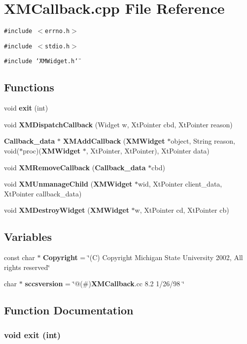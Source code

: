 \section{XMCallback.cpp File Reference}
\label{XMCallback_8cpp}
{\tt \#include $<$errno.h$>$}\par
{\tt \#include $<$stdio.h$>$}\par
{\tt \#include \char`\"{}XMWidget.h\char`\"{}}\par
\subsection*{Functions}
\begin{CompactItemize}
\item 
void {\bf exit} (int)
\item 
void {\bf XMDispatch\-Callback} (Widget w, Xt\-Pointer cbd, Xt\-Pointer reason)
\item 
{\bf Callback\_\-data} $\ast$ {\bf XMAdd\-Callback} ({\bf XMWidget} $\ast$object, String reason, void($\ast$proc)({\bf XMWidget} $\ast$, Xt\-Pointer, Xt\-Pointer), Xt\-Pointer data)
\item 
void {\bf XMRemove\-Callback} ({\bf Callback\_\-data} $\ast$cbd)
\item 
void {\bf XMUnmanage\-Child} ({\bf XMWidget} $\ast$wid, Xt\-Pointer client\_\-data, Xt\-Pointer callback\_\-data)
\item 
void {\bf XMDestroy\-Widget} ({\bf XMWidget} $\ast$w, Xt\-Pointer cd, Xt\-Pointer cb)
\end{CompactItemize}
\subsection*{Variables}
\begin{CompactItemize}
\item 
const char $\ast$ {\bf Copyright} = \char`\"{}(C) Copyright Michigan State University 2002, All rights reserved\char`\"{}
\item 
char $\ast$ {\bf sccsversion} = \char`\"{}@(\#){\bf XMCallback}.cc 8.2 1/26/98 \char`\"{}
\end{CompactItemize}


\subsection{Function Documentation}
\subsubsection{\setlength{\rightskip}{0pt plus 5cm}void exit (int)}\label{XMCallback_8cpp_a2}


